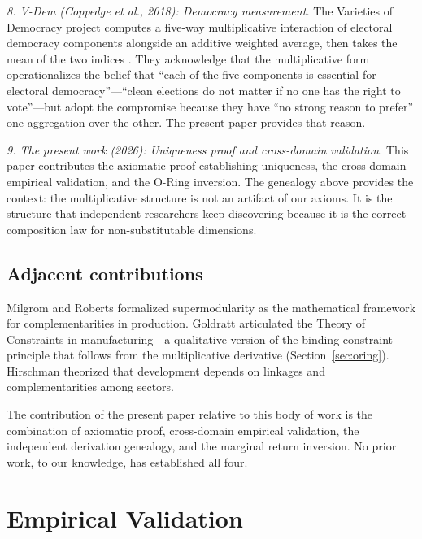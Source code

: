 \documentclass[12pt, a4paper]{article}
\theoremstyle{definition}
\theoremstyle{remark}
\begin{document}
\textit{8. V-Dem (Coppedge et al., 2018): Democracy measurement.} The Varieties of Democracy project computes a five-way multiplicative interaction of electoral democracy components alongside an additive weighted average, then takes the mean of the two indices \cite{coppedge2018}. They acknowledge that the multiplicative form operationalizes the belief that ``each of the five components is essential for electoral democracy''---``clean elections do not matter if no one has the right to vote''---but adopt the compromise because they have ``no strong reason to prefer'' one aggregation over the other. The present paper provides that reason.

\textit{9. The present work (2026): Uniqueness proof and cross-domain validation.} This paper contributes the axiomatic proof establishing uniqueness, the cross-domain empirical validation, and the O-Ring inversion. The genealogy above provides the context: the multiplicative structure is not an artifact of our axioms. It is the structure that independent researchers keep discovering because it is the correct composition law for non-substitutable dimensions.

\subsection{Adjacent contributions}

Milgrom and Roberts \cite{milgrom1990} formalized supermodularity as the mathematical framework for complementarities in production. Goldratt \cite{goldratt1984} articulated the Theory of Constraints in manufacturing---a qualitative version of the binding constraint principle that follows from the multiplicative derivative (Section~\ref{sec:oring}). Hirschman \cite{hirschman1958} theorized that development depends on linkages and complementarities among sectors.

The contribution of the present paper relative to this body of work is the combination of axiomatic proof, cross-domain empirical validation, the independent derivation genealogy, and the marginal return inversion. No prior work, to our knowledge, has established all four.


\section{Empirical Validation}\label{sec:empirical}
\end{document}
